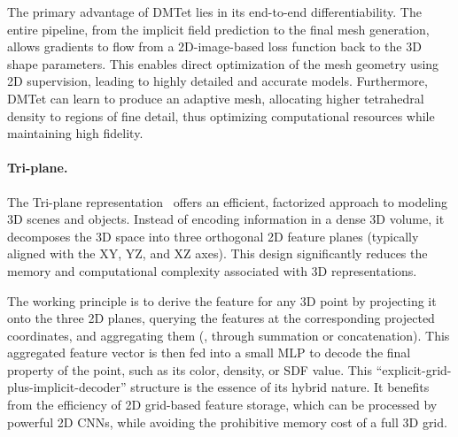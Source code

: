 The primary advantage of DMTet lies in its end-to-end differentiability. 
The entire pipeline, from the implicit field prediction to the final mesh generation, allows gradients to flow from a 2D-image-based loss function back to the 3D shape parameters.
This enables direct optimization of the mesh geometry using 2D supervision, leading to highly detailed and accurate models.
Furthermore, DMTet can learn to produce an adaptive mesh, allocating higher tetrahedral density to regions of fine detail, thus optimizing computational resources while maintaining high fidelity.


\paragraph{Tri-plane.}
The Tri-plane representation~\cite{chan2022efficient} offers an efficient, factorized approach to modeling 3D scenes and objects. Instead of encoding information in a dense 3D volume, it decomposes the 3D space into three orthogonal 2D feature planes (typically aligned with the XY, YZ, and XZ axes). This design significantly reduces the memory and computational complexity associated with 3D representations.

The working principle is to derive the feature for any 3D point by projecting it onto the three 2D planes, querying the features at the corresponding projected coordinates, and aggregating them (\eg, through summation or concatenation). 
This aggregated feature vector is then fed into a small MLP to decode the final property of the point, such as its color, density, or SDF value.
This ``explicit-grid-plus-implicit-decoder'' structure is the essence of its hybrid nature.
It benefits from the efficiency of 2D grid-based feature storage, which can be processed by powerful 2D CNNs, while avoiding the prohibitive memory cost of a full 3D grid.


